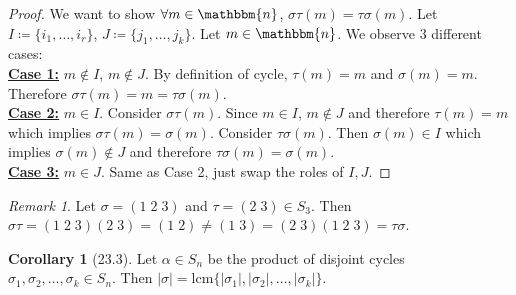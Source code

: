\documentclass{article}
\newcommand{\coleq}{\coloneqq}
\newcommand{\define}[1]{\textbf{\underline{#1}}}
\theoremstyle{definition}
\newtheorem*{cor}{Corollary}
\theoremstyle{remark}
\newtheorem*{rmk}{Remark}
\begin{document}
{{            \begin{proof}
                We want to show $\forall m \in \mathbbm{n}$, $\sigma\tau(m)=\tau\sigma(m)$. Let $I\coleq\{i_1,\ldots,i_r\}$, $J\coleq\{j_1,\ldots,j_k\}$. Let $m\in \mathbbm{n}$. We observe 3 different cases:\\
                \define{Case 1:} $m \notin I$, $m\notin J$. By definition of cycle, $\tau(m)=m$ and $\sigma(m)=m$. Therefore $\sigma\tau(m)=m=\tau\sigma(m)$.\\
                \define{Case 2:} $m\in I$. Consider $\sigma\tau(m)$. Since $m\in I$, $m\notin J$ and therefore $\tau(m)=m$ which implies $\sigma\tau(m)=\sigma(m)$. Consider $\tau\sigma(m)$. Then $\sigma(m)\in I$ which implies $\sigma(m)\notin J$ and therefore $\tau\sigma(m)=\sigma(m)$.\\
                \define{Case 3:} $m\in J$. Same as Case 2, just swap the roles of $I,J$.
            \end{proof}
            
            \begin{rmk}
                Let $\sigma=(1\;2\;3)$ and $\tau=(2\;3)\in S_3$. Then $\sigma\tau=(1\;2\;3)(2\;3)=(1\;2)\neq(1\;3)=(2\;3)(1\;2\;3)=\tau\sigma$.
            \end{rmk}
            
            \begin{cor}[23.3]
                Let $\alpha \in S_n$ be the product of disjoint cycles $\sigma_1,\sigma_2,\ldots,\sigma_k\in S_n$. Then $|\sigma|=\mathrm{lcm}\{|\sigma_1|,|\sigma_2|,\ldots,|\sigma_k|\}$.
            \end{cor}
        }
    }
    
\end{document}
